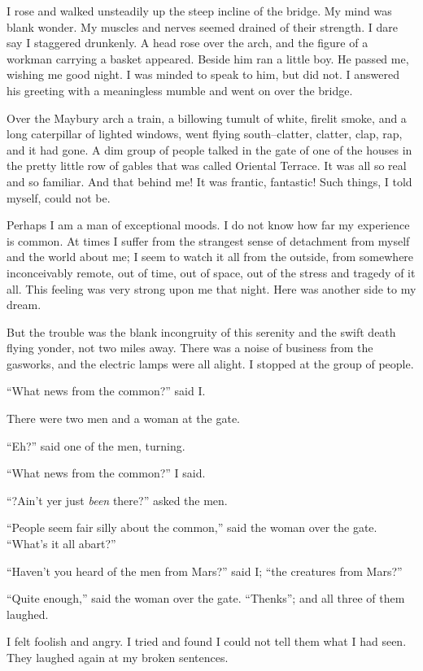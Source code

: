 I rose and walked unsteadily up the steep incline of the bridge. My
mind was blank wonder. My muscles and nerves seemed drained of
their strength. I dare say I staggered drunkenly. A head rose over
the arch, and the figure of a workman carrying a basket appeared.
Beside him ran a little boy. He passed me, wishing me good night. I
was minded to speak to him, but did not. I answered his greeting
with a meaningless mumble and went on over the bridge.

Over the Maybury arch a train, a billowing tumult of white, firelit
smoke, and a long caterpillar of lighted windows, went flying
south--clatter, clatter, clap, rap, and it had gone. A dim group of
people talked in the gate of one of the houses in the pretty little
row of gables that was called Oriental Terrace. It was all so real
and so familiar. And that behind me! It was frantic, fantastic!
Such things, I told myself, could not be.

Perhaps I am a man of exceptional moods. I do not know how far my
experience is common. At times I suffer from the strangest sense of
detachment from myself and the world about me; I seem to watch it
all from the outside, from somewhere inconceivably remote, out of
time, out of space, out of the stress and tragedy of it all. This
feeling was very strong upon me that night. Here was another side
to my dream.

But the trouble was the blank incongruity of this serenity and the
swift death flying yonder, not two miles away. There was a noise of
business from the gasworks, and the electric lamps were all alight.
I stopped at the group of people.

``What news from the common?'' said I.

There were two men and a woman at the gate.

``Eh?'' said one of the men, turning.

``What news from the common?'' I said.

``?Ain't yer just \emph{been} there?'' asked the men.

``People seem fair silly about the common,'' said the woman over the
gate. ``What's it all abart?''

``Haven't you heard of the men from Mars?'' said I; ``the creatures
from Mars?''

``Quite enough,'' said the woman over the gate. ``Thenks''; and all
three of them laughed.

I felt foolish and angry. I tried and found I could not tell them
what I had seen. They laughed again at my broken sentences.

